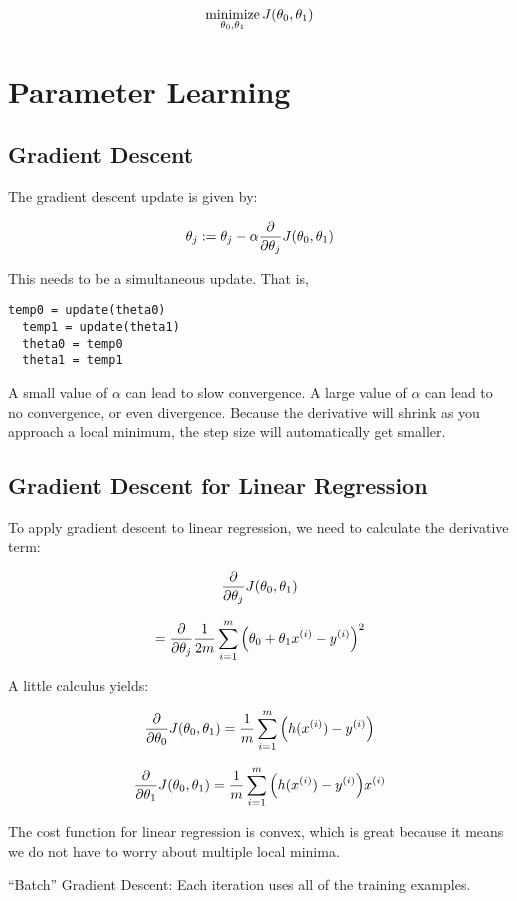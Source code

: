 \[ \underset{\theta_0, \theta_1}{\textrm{minimize}} \, J(\theta_0, \theta_1) \]

\section{Parameter Learning}

\subsection{Gradient Descent}

The gradient descent update is given by:

\[ \theta_j := \theta_j - \alpha \pdv{\theta_j} J(\theta_0, \theta_1) \]

This needs to be a simultaneous update.  That is,

\begin{lstlisting}[style=Matlab-editor]
  temp0 = update(theta0)
  temp1 = update(theta1)
  theta0 = temp0
  theta1 = temp1
\end{lstlisting}

A small value of $\alpha$ can lead to slow convergence.
A large value of $\alpha$ can lead to no convergence, or even divergence.
Because the derivative will shrink as you approach a local minimum, the step size will automatically get smaller.

\subsection{Gradient Descent for Linear Regression}

To apply gradient descent to linear regression, we need to calculate the derivative term:

\[ \pdv{\theta_j} J(\theta_0, \theta_1) \]

\[ = \pdv{\theta_j} \frac{1}{2m} \sum_{i=1}^m \qty(\theta_0 + \theta_1 x_{}^{(i)} - y_{}^{(i)})^2 \]

A little calculus yields:

\[ \pdv{\theta_0} J(\theta_0, \theta_1)  = \frac{1}{m} \sum_{i=1}^m \qty(h(x_{}^{(i)}) - y_{}^{(i)}) \]

\[ \pdv{\theta_1} J(\theta_0, \theta_1)  = \frac{1}{m} \sum_{i=1}^m \qty(h(x_{}^{(i)}) - y_{}^{(i)}) x_{}^{(i)} \]

The cost function for linear regression is convex, which is great because 
it means we do not have to worry about multiple local minima.

``Batch'' Gradient Descent: Each iteration uses all of the training examples.

